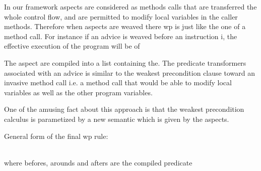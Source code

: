 
In our framework aspects are considered as methods calls that are
transferred the whole control flow, and are permitted to modify local
variables in the caller methods. Therefore when aspects are weaved
there wp is just like the one of a method call.  For instance if an
advice is weaved before an instruction i, the effective execution of
the program will be of

The aspect are compiled into a list containing the.  The predicate
transformers associated with an advice is similar to the weakest
precondition clause toward an invasive method call i.e. a method call
that would be able to modify local variables as well as the other
program variables.

One of the amusing fact about this approach is that the weakest
precondition calculus is parametized by a new semantic which is given
by the aspects.

General form of the final wp rule: 
\bcode

\\
\ecode
where befores, arounds and afters are the compiled predicate
